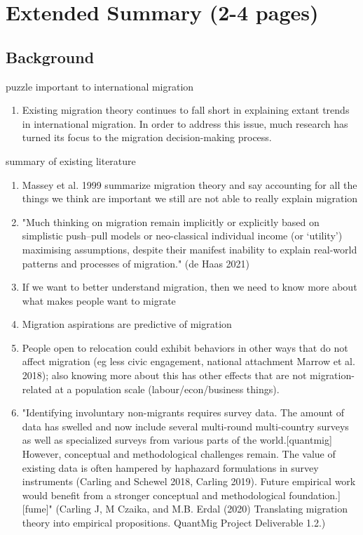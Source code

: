\setlength{\parindent}{4em}
\setlength{\parskip}{1em}
\renewcommand{\baselinestretch}{2.0}
\section*{Extended Summary (2-4 pages)}
\subsection*{Background}
puzzle important to international migration
\begin{enumerate}
    \item Existing migration theory continues to fall short in explaining extant trends in international migration. In order to address this issue, much research has turned  its focus to the migration decision-making process.
\end{enumerate}
summary of existing literature
\begin{enumerate}
	\item Massey et al. 1999 summarize migration theory and say accounting for all the things we think are important we still are not able to really explain migration
	\item "Much thinking on migration remain implicitly or explicitly based on simplistic push–pull models or neo-classical individual income (or ‘utility’) maximising assumptions, despite their manifest inability to explain real-world patterns and processes of migration." (de Haas 2021)
	\item If we want to better understand migration, then we need to know more about what makes people want to migrate
	\item Migration aspirations are predictive of migration
	\item People open to relocation could exhibit behaviors in other ways that do not affect migration (eg less civic engagement, national attachment Marrow et al. 2018); also knowing more about this has other effects that are not migration-related at a population scale (labour/econ/business things).
	\item "Identifying involuntary non-migrants requires survey data. The amount of data has swelled and now include several multi-round multi-country surveys as well as specialized surveys from various parts of the world.[quantmig] However, conceptual and methodological challenges remain. The value of existing data is often hampered by haphazard formulations in survey instruments (Carling and Schewel 2018, Carling 2019). Future empirical work would benefit from a stronger conceptual and methodological foundation.][fume]" (Carling J, M Czaika, and M.B. Erdal (2020) Translating migration theory into empirical propositions. QuantMig Project Deliverable 1.2.)
\end{enumerate}
